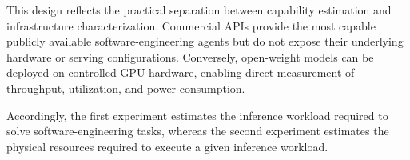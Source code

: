 \documentclass{article}
\begin{document}
This design reflects the practical separation between
capability estimation and infrastructure characterization.
Commercial APIs provide the most capable publicly available
software-engineering agents but do not expose
their underlying hardware or serving configurations.
Conversely,
open-weight models can be deployed on controlled GPU
hardware, enabling direct measurement of throughput,
utilization, and power consumption.

Accordingly,
the first experiment estimates the inference workload
required to solve software-engineering tasks,
whereas the second experiment estimates the physical
resources required to execute a given inference workload.




\end{document}
